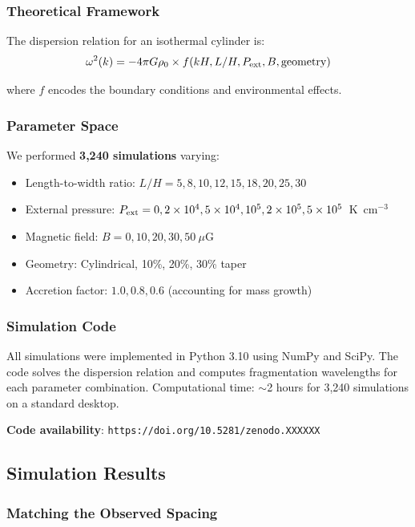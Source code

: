 \documentclass[11pt,a4paper]{article}
\begin{document}
\subsubsection{Theoretical Framework}

The dispersion relation for an isothermal cylinder is:
\begin{equation}
\omega^2(k) = -4\pi G\rho_0 \times f(kH, L/H, P_{\rm ext}, B, {\rm geometry})
\end{equation}

where $f$ encodes the boundary conditions and environmental effects.

\subsubsection{Parameter Space}

We performed \textbf{3,240 simulations} varying:
\begin{itemize}
    \item Length-to-width ratio: $L/H = 5, 8, 10, 12, 15, 18, 20, 25, 30$
    \item External pressure: $P_{\rm ext} = 0, 2\times10^4, 5\times10^4, 10^5, 2\times10^5, 5\times10^5$~K~cm$^{-3}$
    \item Magnetic field: $B = 0, 10, 20, 30, 50~\mu$G
    \item Geometry: Cylindrical, 10\%, 20\%, 30\% taper
    \item Accretion factor: $1.0, 0.8, 0.6$ (accounting for mass growth)
\end{itemize}

\subsubsection{Simulation Code}

All simulations were implemented in Python 3.10 using NumPy and SciPy. The code solves the dispersion relation and computes fragmentation wavelengths for each parameter combination. Computational time: $\sim$2 hours for 3,240 simulations on a standard desktop.

\textbf{Code availability}: \texttt{https://doi.org/10.5281/zenodo.XXXXXX}

\subsection{Simulation Results}

\subsubsection{Matching the Observed Spacing}
\end{document}
